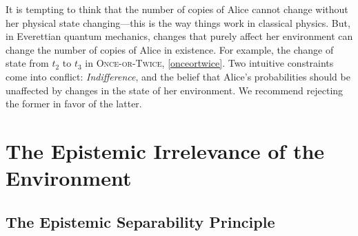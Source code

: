 \documentclass[12pt,onecolumn,secnumarabic,amsmath,amssymb,balancelastpage,nofootinbib]{article}
\begin{document}
It is tempting to think that the number of copies of Alice cannot change without her physical state changing---this is the way things work in classical physics.  But, in Everettian quantum mechanics, changes that purely affect her environment can change the number of copies of Alice in existence.  For example, the change of state from $t_2$ to $t_3$ in \textsc{Once-or-Twice}, \eqref{onceortwice}.  Two intuitive constraints come into conflict: \emph{Indifference}, and the belief that Alice's probabilities should be unaffected by changes in the state of her environment.  We recommend rejecting the former in favor of the latter.

\section{The Epistemic Irrelevance of the Environment}\label{newf}
\subsection{The Epistemic Separability Principle}\label{sec21}
\end{document}

